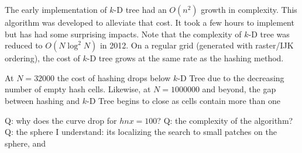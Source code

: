 \documentclass{report}
\begin{document}
The early implementation of $k$-D tree had an $O(n^2)$ growth in complexity. This algorithm was developed to alleviate that cost. It took a few hours to implement but has had some surprising impacts. Note that the complexity of $k$-D tree was reduced to $O(N \log^2 N)$ in 2012. On a regular grid (generated with raster/IJK ordering), the cost of $k$-D tree grows at the same rate as the hashing method. 

At $N=32000$ the cost of hashing drops below $k$-D Tree due to the decreasing number of empty hash cells. Likewise, at $N=1000000$ and beyond, the gap between hashing and $k$-D Tree begins to close as cells contain more than one 


Q: why does the curve drop for $hnx=100$? 
Q: the complexity of the algorithm? 
Q: the sphere I understand: its localizing the search to small patches on the sphere, and 
\end{document}
